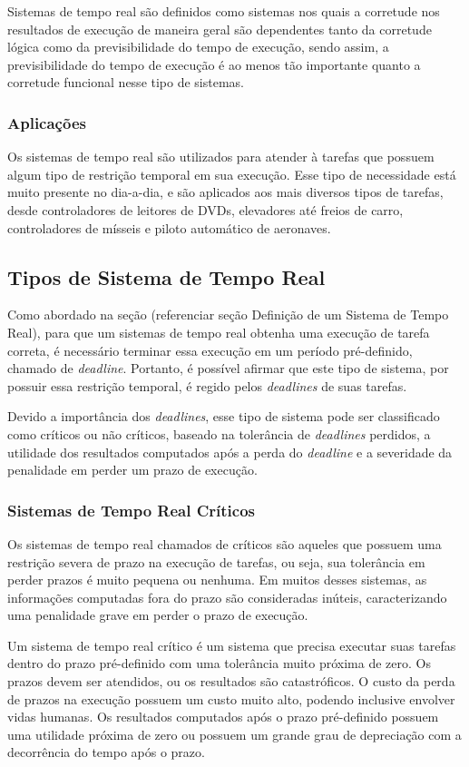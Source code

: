 Sistemas de tempo real são definidos como sistemas nos quais a corretude nos
resultados de execução de maneira geral são dependentes tanto da corretude
lógica como da previsibilidade do tempo de execução, sendo assim, a previsibilidade
do tempo de execução é ao menos tão importante quanto a corretude funcional
nesse tipo de sistemas.~\cite{Li:2003:RCE:829584}

\subsubsection{Aplicações}
Os sistemas de tempo real são utilizados para atender à tarefas que possuem algum tipo
de restrição temporal em sua execução. Esse tipo de necessidade está muito presente no
dia-a-dia, e são aplicados aos mais diversos tipos de tarefas, desde controladores de
leitores de DVDs, elevadores até freios de carro, controladores de mísseis e piloto automático
de aeronaves.

\subsection{Tipos de Sistema de Tempo Real}
Como abordado na seção (referenciar seção Definição de um Sistema de Tempo Real),
para que um sistemas de tempo real obtenha uma execução de tarefa correta,
é necessário terminar essa execução em um período pré-definido, chamado de \textit{deadline}.
Portanto, é possível afirmar que este tipo de sistema, por possuir essa restrição temporal,
é regido pelos \textit{deadlines} de suas tarefas.

Devido a importância dos \textit{deadlines}, esse tipo de sistema pode ser classificado como
críticos ou não críticos, baseado na tolerância de \textit{deadlines} perdidos, a utilidade
dos resultados computados após a perda do \textit{deadline} e a severidade da penalidade em
perder um prazo de execução.

\subsubsection{Sistemas de Tempo Real Críticos}
Os sistemas de tempo real chamados de críticos são aqueles que possuem uma restrição severa
de prazo na execução de tarefas, ou seja, sua tolerância em perder prazos é muito pequena
ou nenhuma. Em muitos desses sistemas, as informações computadas fora do prazo são consideradas
inúteis, caracterizando uma penalidade grave em perder o prazo de execução.

Um sistema de tempo real crítico é um sistema que precisa executar suas tarefas dentro do prazo
pré-definido com uma tolerância muito próxima de zero. Os prazos devem ser atendidos, ou os resultados
são catastróficos. O custo da perda de prazos na execução possuem um custo muito alto, podendo inclusive
envolver vidas humanas. Os resultados computados após o prazo pré-definido possuem uma utilidade próxima
de zero ou possuem um grande grau de depreciação com a decorrência do tempo após o prazo.~\cite{Li:2003:RCE:829584}


